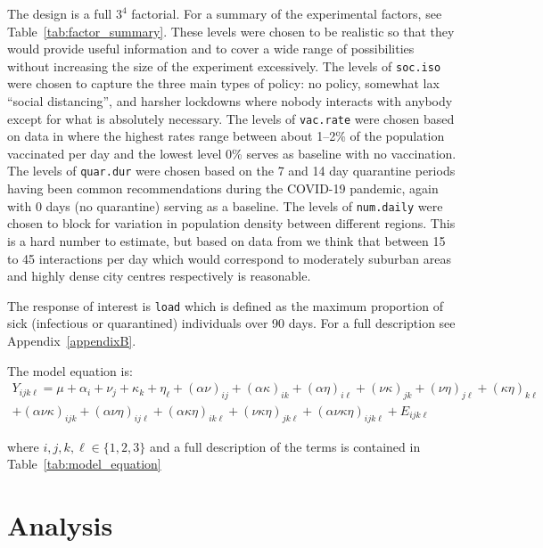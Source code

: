 \documentclass[12pt,a4paper]{article}
\begin{document}
The design is a full $3^4$ factorial. For a summary of the experimental factors, see Table~\ref{tab:factor_summary}. These levels were chosen to be realistic so that they would provide useful information and to cover a wide range of possibilities without increasing the size of the experiment excessively. The levels of \verb`soc.iso` were chosen to capture the three main types of policy: no policy, somewhat lax ``social distancing'', and harsher lockdowns where nobody interacts with anybody except for what is absolutely necessary. The levels of \verb`vac.rate` were chosen based on data in \cite{WHO} where the highest rates range between about 1--2\% of the population vaccinated per day and the lowest level 0\% serves as baseline with no vaccination. The levels of \verb`quar.dur` were chosen based on the 7 and 14 day quarantine periods having been common recommendations during the COVID-19 pandemic, again with 0 days (no quarantine) serving as a baseline. The levels of \verb`num.daily` were chosen to block for variation in population density between different regions. This is a hard number to estimate, but based on data from \cite{contacts} we think that between 15 to 45 interactions per day which would correspond to moderately suburban areas and highly dense city centres respectively is reasonable.

The response of interest is \verb`load` which is defined as the maximum proportion of sick (infectious or quarantined) individuals over 90 days. For a full description see Appendix~\ref{appendixB}.

 The model equation is:
\vspace*{-3mm}
\begin{align*}
	Y_{ijk\ell}=\mu+\alpha_i+\nu_j+\kappa_k+\eta_\ell+(\alpha\nu)_{ij}+(\alpha\kappa)_{ik}+(\alpha\eta)_{i\ell}+(\nu\kappa)_{jk}+(\nu\eta)_{j\ell} + (\kappa\eta)_{k\ell}\\
	+(\alpha\nu\kappa)_{ijk}+(\alpha\nu\eta)_{ij\ell}+(\alpha\kappa\eta)_{ik\ell} + (\nu\kappa\eta)_{jk\ell} + (\alpha\nu\kappa\eta)_{ijk\ell}+E_{ijk\ell}
\end{align*}
\vspace*{-10mm}

where $i,j,k,\ell\in\{1,2,3\}$ and a full description of the terms is contained in Table~\ref{tab:model_equation}

\section{Analysis}\label{section3}
\end{document}
